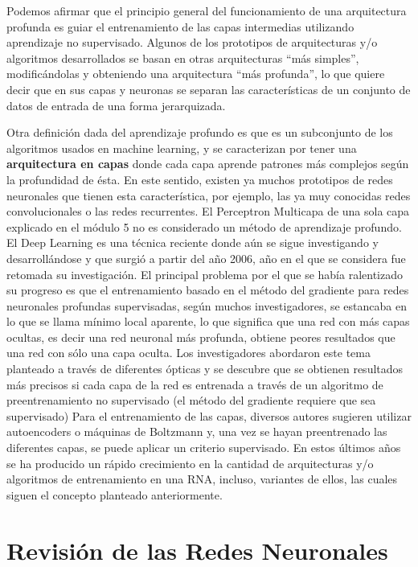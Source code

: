 \documentclass[
  a4paper,
  DIV=11,
  numbers=noendperiod]{scrreprt}
\begin{document}
Podemos afirmar que el principio general del funcionamiento de una
arquitectura profunda es guiar el entrenamiento de las capas intermedias
utilizando aprendizaje no supervisado. Algunos de los prototipos de
arquitecturas y/o algoritmos desarrollados se basan en otras
arquitecturas ``más simples'', modificándolas y obteniendo una
arquitectura ``más profunda'', lo que quiere decir que en sus capas y
neuronas se separan las características de un conjunto de datos de
entrada de una forma jerarquizada.

Otra definición dada del aprendizaje profundo es que es un subconjunto
de los algoritmos usados en machine learning, y se caracterizan por
tener una \textbf{arquitectura en capas} donde cada capa aprende
patrones más complejos según la profundidad de ésta. En este sentido,
existen ya muchos prototipos de redes neuronales que tienen esta
característica, por ejemplo, las ya muy conocidas redes convolucionales
o las redes recurrentes. El Perceptron Multicapa de una sola capa
explicado en el módulo 5 no es considerado un método de aprendizaje
profundo. El Deep Learning es una técnica reciente donde aún se sigue
investigando y desarrollándose y que surgió a partir del año 2006, año
en el que se considera fue retomada su investigación. El principal
problema por el que se había ralentizado su progreso es que el
entrenamiento basado en el método del gradiente para redes neuronales
profundas supervisadas, según muchos investigadores, se estancaba en lo
que se llama mínimo local aparente, lo que significa que una red con más
capas ocultas, es decir una red neuronal más profunda, obtiene peores
resultados que una red con sólo una capa oculta. Los investigadores
abordaron este tema planteado a través de diferentes ópticas y se
descubre que se obtienen resultados más precisos si cada capa de la red
es entrenada a través de un algoritmo de preentrenamiento no supervisado
(el método del gradiente requiere que sea supervisado) Para el
entrenamiento de las capas, diversos autores sugieren utilizar
autoencoders o máquinas de Boltzmann y, una vez se hayan preentrenado
las diferentes capas, se puede aplicar un criterio supervisado. En estos
últimos años se ha producido un rápido crecimiento en la cantidad de
arquitecturas y/o algoritmos de entrenamiento en una RNA, incluso,
variantes de ellos, las cuales siguen el concepto planteado
anteriormente.

\hypertarget{revisiuxf3n-de-las-redes-neuronales}{%
\section{Revisión de las Redes
Neuronales}\label{revisiuxf3n-de-las-redes-neuronales}}
\end{document}
